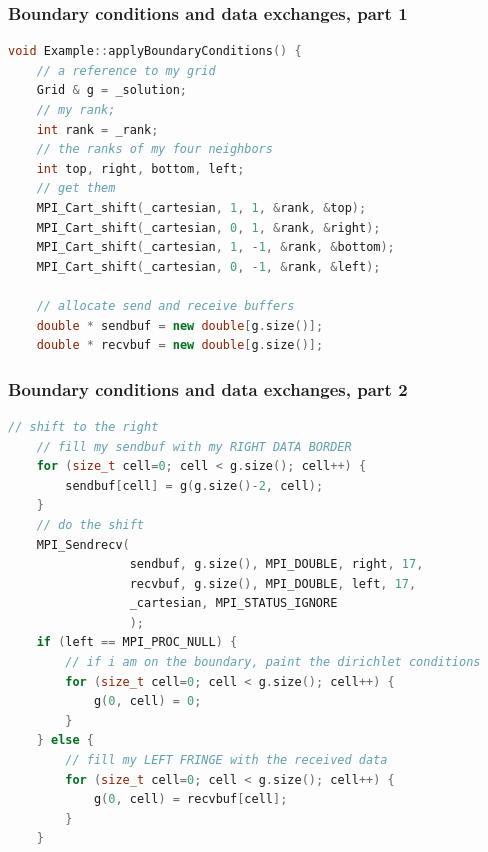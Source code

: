\begin{frame}[fragile]
%
  \frametitle{Boundary conditions and data exchanges, part 1}
%
  \begin{lstlisting}[language=c++,name=mpi:example-impl]
void Example::applyBoundaryConditions() {
    // a reference to my grid
    Grid & g = _solution;
    // my rank;
    int rank = _rank;
    // the ranks of my four neighbors
    int top, right, bottom, left;
    // get them
    MPI_Cart_shift(_cartesian, 1, 1, &rank, &top);
    MPI_Cart_shift(_cartesian, 0, 1, &rank, &right);
    MPI_Cart_shift(_cartesian, 1, -1, &rank, &bottom);
    MPI_Cart_shift(_cartesian, 0, -1, &rank, &left);

    // allocate send and receive buffers
    double * sendbuf = new double[g.size()];
    double * recvbuf = new double[g.size()];
  \end{lstlisting}
% 
\end{frame}

\begin{frame}[fragile]
%
  \frametitle{Boundary conditions and data exchanges, part 2}
%
  \begin{lstlisting}[language=c++,name=mpi:example-impl]
    // shift to the right
    // fill my sendbuf with my RIGHT DATA BORDER
    for (size_t cell=0; cell < g.size(); cell++) {
        sendbuf[cell] = g(g.size()-2, cell); 
    }
    // do the shift 
    MPI_Sendrecv(
                 sendbuf, g.size(), MPI_DOUBLE, right, 17,
                 recvbuf, g.size(), MPI_DOUBLE, left, 17,
                 _cartesian, MPI_STATUS_IGNORE
                 );
    if (left == MPI_PROC_NULL) {
        // if i am on the boundary, paint the dirichlet conditions
        for (size_t cell=0; cell < g.size(); cell++) {
            g(0, cell) = 0;
        }
    } else {
        // fill my LEFT FRINGE with the received data
        for (size_t cell=0; cell < g.size(); cell++) {
            g(0, cell) = recvbuf[cell];
        }
    }
  \end{lstlisting}
% 
\end{frame}

